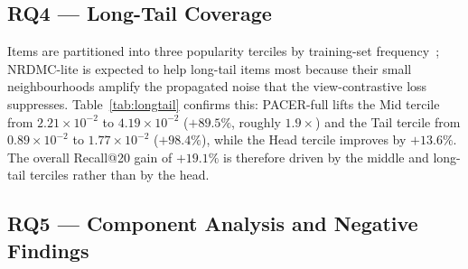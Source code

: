 \documentclass[conference]{IEEEtran}
\begin{document}
\subsection{RQ4 --- Long-Tail Coverage}
\label{sec:rq4}

Items are partitioned into three popularity terciles by training-set
frequency~\cite{krichene2020sampled}; NRDMC-lite is expected to help
long-tail items most because their small neighbourhoods amplify the
propagated noise that the view-contrastive loss suppresses.
Table~\ref{tab:longtail} confirms this: PACER-full lifts the
Mid tercile from $2.21{\times}10^{-2}$ to $4.19{\times}10^{-2}$
($+89.5\%$, roughly $1.9{\times}$) and the Tail tercile from
$0.89{\times}10^{-2}$ to $1.77{\times}10^{-2}$ ($+98.4\%$), while the
Head tercile improves by $+13.6\%$. The overall Recall@20 gain of
$+19.1\%$ is therefore driven by the middle and long-tail terciles
rather than by the head.

\begin{table}[!t]
\caption{RQ4 --- Recall@20 by item-popularity tercile on Amazon
Clothing, mean $\pm$ std over the five KSE-locked seeds. Tercile
split by training-set frequency; Head/Mid/Tail = top/middle/bottom
third with
$|\mathcal{I}_{\mathrm{head}}|=|\mathcal{I}_{\mathrm{mid}}|=7{,}678$,
$|\mathcal{I}_{\mathrm{tail}}|=7{,}677$.}
\label{tab:longtail}
\centering
\renewcommand{\arraystretch}{1.10}
\setlength{\tabcolsep}{3pt}
\end{table}

\subsection{RQ5 --- Component Analysis and Negative Findings}
\label{sec:factorial}
\end{document}
